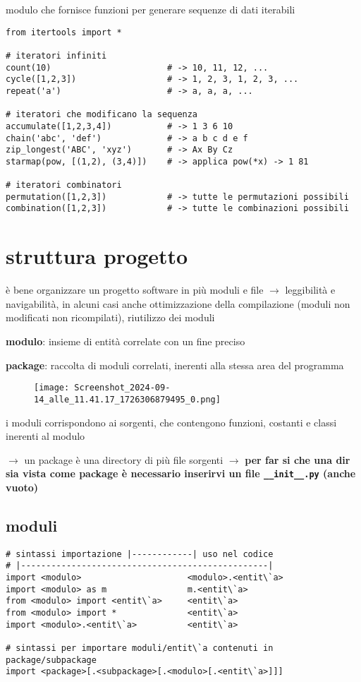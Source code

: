 modulo che fornisce funzioni per generare sequenze di dati iterabili

\begin{verbatim}
from itertools import *

# iteratori infiniti
count(10) 						# -> 10, 11, 12, ...
cycle([1,2,3]) 					# -> 1, 2, 3, 1, 2, 3, ...
repeat('a') 					# -> a, a, a, ...

# iteratori che modificano la sequenza
accumulate([1,2,3,4]) 			# -> 1 3 6 10
chain('abc', 'def') 			# -> a b c d e f
zip_longest('ABC', 'xyz') 		# -> Ax By Cz
starmap(pow, [(1,2), (3,4)]) 	# -> applica pow(*x) -> 1 81

# iteratori combinatori
permutation([1,2,3]) 			# -> tutte le permutazioni possibili
combination([1,2,3]) 			# -> tutte le combinazioni possibili
\end{verbatim}

\section{struttura progetto}

\`e bene organizzare un progetto software in pi\`u moduli e file $\rightarrow$ leggibilit\`a e navigabilit\`a, in alcuni casi anche ottimizzazione della compilazione (moduli non modificati non ricompilati), riutilizzo dei moduli

\textbf{modulo}: insieme di entit\`a correlate con un fine preciso

\textbf{package}: raccolta di moduli correlati, inerenti alla stessa area del programma

\begin{figure}[h]
\centering
\texttt{[image: Screenshot\_2024-09-14\_alle\_11.41.17\_1726306879495\_0.png]}
\end{figure}

i moduli corrispondono ai sorgenti, che contengono funzioni, costanti e classi inerenti al modulo

$\rightarrow$ un package \`e una directory di pi\`u file sorgenti $\rightarrow$ \textbf{per far si che una dir sia vista come package \`e necessario inserirvi un file \texttt{__init__.py} (anche vuoto)}

\subsection{moduli}

\begin{verbatim}
# sintassi importazione |------------| uso nel codice
# |-------------------------------------------------|
import <modulo>						<modulo>.<entit\`a>
import <modulo>	as m				m.<entit\`a>
from <modulo> import <entit\`a>		<entit\`a>
from <modulo> import *				<entit\`a>
import <modulo>.<entit\`a>			<entit\`a>

# sintassi per importare moduli/entit\`a contenuti in package/subpackage
import <package>[.<subpackage>[.<modulo>[.<entit\`a>]]]
\end{verbatim}

